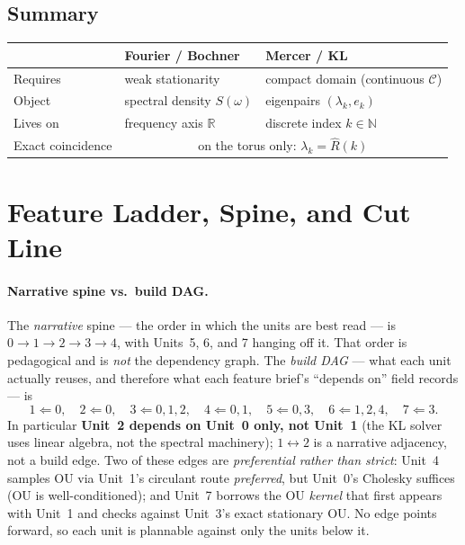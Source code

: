 \documentclass[11pt]{article}
\begin{document}
\subsection{Summary}

\begin{center}
\begin{tabular}{@{}p{3.1cm}p{4.3cm}p{4.3cm}@{}}
\toprule
& \textbf{Fourier / Bochner} & \textbf{Mercer / KL} \\
\midrule
Requires & weak stationarity & compact domain (continuous $\mathcal{C}$) \\
Object & spectral density $S(\omega)$ & eigenpairs $(\lambda_k,e_k)$ \\
Lives on & frequency axis $\mathbb{R}$ & discrete index $k\in\mathbb{N}$ \\
Exact coincidence & \multicolumn{2}{c}{on the torus only: $\lambda_k=\hat R(k)$} \\
\bottomrule
\end{tabular}
\end{center}

\section{Feature Ladder, Spine, and Cut Line}

\paragraph{Narrative spine vs.\ build DAG.} The \emph{narrative} spine --- the order in which the
units are best read --- is $0\to1\to2\to3\to4$, with Units~5, 6, and 7 hanging off it. That order is
pedagogical and is \emph{not} the dependency graph. The \emph{build DAG} --- what each unit actually
reuses, and therefore what each feature brief's ``depends on'' field records --- is
\[
1\Leftarrow 0,\quad 2\Leftarrow 0,\quad 3\Leftarrow 0,1,2,\quad 4\Leftarrow 0,1,\quad
5\Leftarrow 0,3,\quad 6\Leftarrow 1,2,4,\quad 7\Leftarrow 3.
\]
In particular \textbf{Unit~2 depends on Unit~0 only, not Unit~1} (the KL solver uses linear algebra,
not the spectral machinery); $1\leftrightarrow2$ is a narrative adjacency, not a build edge. Two of
these edges are \emph{preferential rather than strict}: Unit~4 samples OU via Unit~1's circulant
route \emph{preferred}, but Unit~0's Cholesky suffices (OU is well-conditioned); and Unit~7 borrows
the OU \emph{kernel} that first appears with Unit~1 and checks against Unit~3's exact stationary OU.
No edge points forward, so each unit is plannable against only the units below it.
\end{document}

